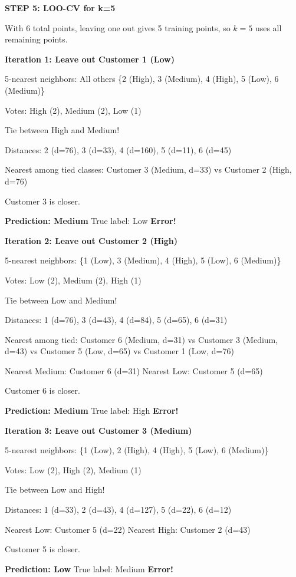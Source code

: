 \documentclass[12pt]{article}
\begin{document}
\begin{solution}
\textbf{STEP 5: LOO-CV for k=5}

With 6 total points, leaving one out gives 5 training points, so \(k=5\) uses all remaining points.

\textbf{Iteration 1: Leave out Customer 1 (Low)}

5-nearest neighbors: All others \{2 (High), 3 (Medium), 4 (High), 5 (Low), 6 (Medium)\}

Votes: High (2), Medium (2), Low (1)

Tie between High and Medium!

Distances: 2 (d=76), 3 (d=33), 4 (d=160), 5 (d=11), 6 (d=45)

Nearest among tied classes: Customer 3 (Medium, d=33) vs Customer 2 (High, d=76)

Customer 3 is closer.

\textbf{Prediction: Medium} \quad True label: Low \quad \textbf{Error!}

\textbf{Iteration 2: Leave out Customer 2 (High)}

5-nearest neighbors: \{1 (Low), 3 (Medium), 4 (High), 5 (Low), 6 (Medium)\}

Votes: Low (2), Medium (2), High (1)

Tie between Low and Medium!

Distances: 1 (d=76), 3 (d=43), 4 (d=84), 5 (d=65), 6 (d=31)

Nearest among tied: Customer 6 (Medium, d=31) vs Customer 3 (Medium, d=43) vs Customer 5 (Low, d=65) vs Customer 1 (Low, d=76)

Nearest Medium: Customer 6 (d=31)
Nearest Low: Customer 5 (d=65)

Customer 6 is closer.

\textbf{Prediction: Medium} \quad True label: High \quad \textbf{Error!}

\textbf{Iteration 3: Leave out Customer 3 (Medium)}

5-nearest neighbors: \{1 (Low), 2 (High), 4 (High), 5 (Low), 6 (Medium)\}

Votes: Low (2), High (2), Medium (1)

Tie between Low and High!

Distances: 1 (d=33), 2 (d=43), 4 (d=127), 5 (d=22), 6 (d=12)

Nearest Low: Customer 5 (d=22)
Nearest High: Customer 2 (d=43)

Customer 5 is closer.

\textbf{Prediction: Low} \quad True label: Medium \quad \textbf{Error!}


\end{solution}
\end{document}
